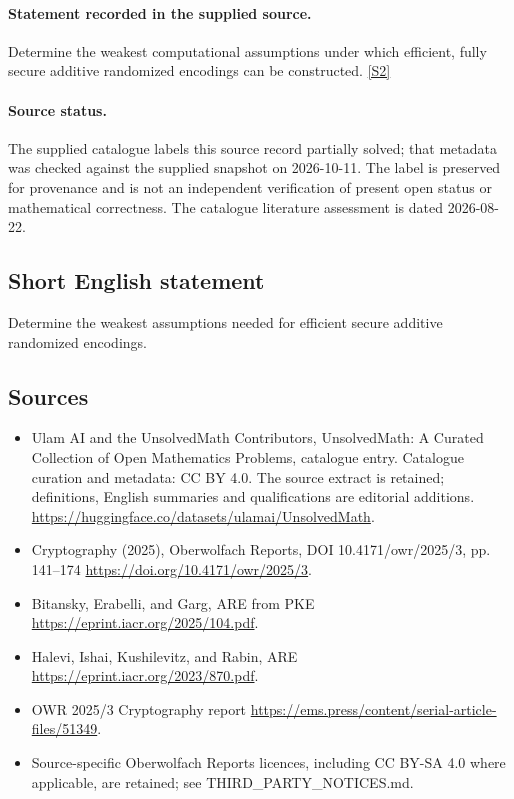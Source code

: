 \documentclass[11pt]{article}
\begin{document}
\paragraph{Statement recorded in the supplied source.}
Determine the weakest computational assumptions under which efficient, fully secure additive randomized encodings can be constructed. \href{https://doi.org/10.4171/owr/2025/3}{[S2]}
\paragraph{Source status.}
The supplied catalogue labels this source record partially solved; that metadata was checked against the supplied snapshot on 2026-10-11. The label is preserved for provenance and is not an independent verification of present open status or mathematical correctness. The catalogue literature assessment is dated 2026-08-22.
\subsection{Short English statement}
Determine the weakest assumptions needed for efficient secure additive randomized encodings.
\subsection{Sources}
\begin{itemize}
\item[S1] Ulam AI and the UnsolvedMath Contributors, UnsolvedMath: A Curated Collection of Open Mathematics Problems, catalogue entry. Catalogue curation and metadata: CC BY 4.0. The source extract is retained; definitions, English summaries and qualifications are editorial additions.
\url{https://huggingface.co/datasets/ulamai/UnsolvedMath}.
\item[S2] Cryptography (2025), Oberwolfach Reports, DOI 10.4171/owr/2025/3, pp. 141--174
\url{https://doi.org/10.4171/owr/2025/3}.
\item[S3] Bitansky, Erabelli, and Garg, ARE from PKE
\url{https://eprint.iacr.org/2025/104.pdf}.
\item[S4] Halevi, Ishai, Kushilevitz, and Rabin, ARE
\url{https://eprint.iacr.org/2023/870.pdf}.
\item[S5] OWR 2025/3 Cryptography report
\url{https://ems.press/content/serial-article-files/51349}.
\item Source-specific Oberwolfach Reports licences, including CC BY-SA 4.0 where applicable, are retained; see THIRD\_PARTY\_NOTICES.md.
\end{itemize}
\end{document}
